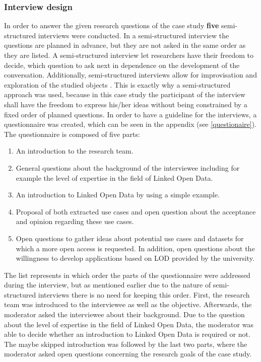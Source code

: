 \documentclass{article}
\begin{document}
\subsubsection{Interview design}
\label{lod-benefits-challenges:interview-design}
In order to answer the given research questions of the case study \textbf{five} semi-structured interviews were conducted. In a semi-structured interview the questions are planned in advance, but they are not asked in the same order as they are listed. A semi-structured interview let researchers have their freedom to decide, which question to ask next in dependence on the development of the conversation. Additionally, semi-structured interviews allow for improvisation and exploration of the
studied objects \cite{runeson_guidelines_2008}. This is exactly why a semi-structured approach was used, because in this case study the participant of the interview shall have the freedom to express his/her ideas without being constrained by a fixed order of planned questions. In order to have a guideline for the interviews, a questionnaire was created, which can be seen in the appendix (see \ref{questionaire}). The questionnaire is composed of five parts:
\begin{enumerate}
	\item An introduction to the research team.
	\item General questions about the background of the interviewee including for example the level of expertise in the field of Linked Open Data.
	\item An introduction to Linked Open Data by using a simple example.   
	\item Proposal of both extracted use cases and open question about the acceptance and opinion regarding these use cases.
	\item Open questions to gather ideas about potential use cases and datasets for which a more open access is requested. In addition, open questions about the willingness to develop applications based on LOD provided by the university.
\end{enumerate}

The list represents in which order the parts of the questionnaire were addressed during the interview, but as mentioned earlier due to the nature of semi-structured interviews there is no need for keeping this order. First, the research team was introduced to the interviewee as well as the objective. Afterwards, the moderator asked the interviewee about their background. Due to the question about the level of expertise in the field of Linked Open Data, the moderator was able to decide whether an introduction to Linked Open Data is required or not. The maybe skipped introduction was followed by the last two parts, where the moderator asked open questions concerning the research goals of the case study. 
\end{document}
